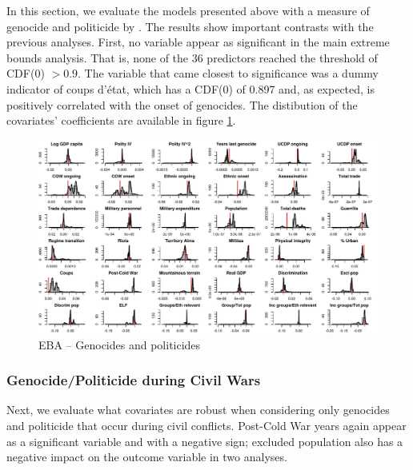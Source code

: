 In this section, we evaluate the models presented above with a measure of genocide and politicide by \citet{harff2003no}. The results show important contrasts with the previous analyses. First, no variable appear as significant in the main extreme bounds analysis. That is, none of the 36 predictors reached the threshold of CDF(0) $> 0.9$. The variable that came closest to significance was a dummy indicator of coups d'état, which has a CDF(0) of 0.897 and, as expected, is positively correlated with the onset of genocides. The distibution of the covariates' coefficients are available in figure \ref{fig:uamk}.

\clearpage
\begin{figure}
    \centering
    \includegraphics[width=\textwidth]{images/uamk.pdf}
    \caption{EBA -- Genocides and politicides}
    \label{fig:uamk}
\end{figure}
\clearpage

\subsubsection{Genocide/Politicide during Civil Wars}

Next, we evaluate what covariates are robust when considering only genocides and politicide that occur during civil conflicts. Post-Cold War years again appear as a significant variable and with a negative sign; excluded population also has a negative impact on the outcome variable in two analyses.

\vspace{1cm}

